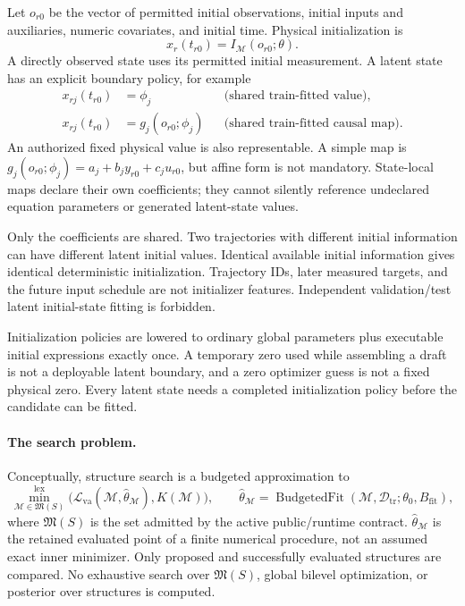 \documentclass[11pt]{article}
\newcommand{\Dtr}{\mathcal{D}_{\mathrm{tr}}}
\newcommand{\M}{\mathcal{M}}
\newcommand{\Loss}{\mathcal{L}}
\begin{document}
Let $o_{r0}$ be the vector of permitted initial observations, initial inputs and
auxiliaries, numeric covariates, and initial time. Physical initialization is
\begin{equation}
 x_r(t_{r0})=I_{\M}(o_{r0};\theta).
 \label{eq:initialization}
\end{equation}
A directly observed state uses its permitted initial measurement. A latent state
has an explicit boundary policy, for example
\begin{align}
 x_{rj}(t_{r0})&=\phi_j
     &&\text{(shared train-fitted value)},\\
 x_{rj}(t_{r0})&=g_j(o_{r0};\phi_j)
     &&\text{(shared train-fitted causal map)}.
\end{align}
An authorized fixed physical value is also representable. A simple map is
$g_j(o_{r0};\phi_j)=a_j+b_jy_{r0}+c_ju_{r0}$, but affine form is not mandatory.
State-local maps declare their own coefficients; they cannot silently reference
undeclared equation parameters or generated latent-state values.

Only the coefficients are shared. Two trajectories with different initial
information can have different latent initial values. Identical available
initial information gives identical deterministic initialization. Trajectory
IDs, later measured targets, and the future input schedule are not initializer
features. Independent validation/test latent initial-state fitting is forbidden.

Initialization policies are lowered to ordinary global parameters plus executable
initial expressions exactly once. A temporary zero used while assembling a draft
is not a deployable latent boundary, and a zero optimizer guess is not a fixed
physical zero. Every latent state needs a completed initialization policy before
the candidate can be fitted.

\paragraph{The search problem.}
Conceptually, structure search is a budgeted approximation to
\begin{equation}
 \min_{\M\in\mathfrak M(S)}^{\mathrm{lex}}
 \bigl(\Loss_{\mathrm{va}}(\M,\widehat\theta_{\M}),K(\M)\bigr),
 \qquad
 \widehat\theta_{\M}=
 \operatorname{BudgetedFit}(\M,\Dtr;\theta_0,B_{\mathrm{fit}}),
\end{equation}
where $\mathfrak M(S)$ is the set admitted by the active public/runtime contract.
$\widehat\theta_{\M}$ is the retained evaluated point of a finite numerical
procedure, not an assumed exact inner minimizer. Only proposed and successfully
evaluated structures are compared. No exhaustive search over $\mathfrak M(S)$,
global bilevel optimization, or posterior over structures is computed.
\end{document}

